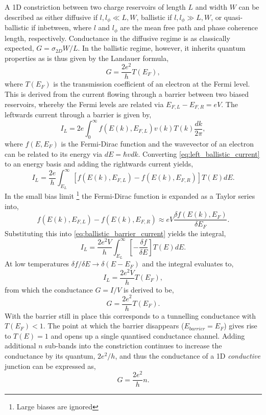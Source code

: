 \documentclass[12pt, a4paper, twoside]{book}
\begin{document}
A 1D constriction between two charge reservoirs of length $L$ and width $W$ can be described as either diffusive if $l,l_\phi \ll L,W$, ballistic if $l,l_\phi \gg L,W$, or quasi-ballistic if inbetween, where $l$ and $l_\phi$ are the mean free path and phase coherence length, respectively. Conductance in the diffusive regime is as classically expected, $G=\sigma_{2D}W/L$. In the ballistic regime, however, it inherits quantum properties as is thus given by the Landauer formula,
\begin{equation} G=\frac{2e^2}{h}T(E_F), \end{equation}
where $T(E_F)$ is the transmission coefficient of an electron at the Fermi level. This is derived from the current flowing through a barrier between two biased reservoirs, whereby the Fermi levels are related via $E_{F,L} - E_{F,R} = eV$. The leftwards current through a barrier is given by,
\begin{equation}
	I_L = 2e \int_0^\infty f(E(k), E_{F,L}) v(k) T(k) \frac{dk}{2\pi},
	\label{eq:left_ballistic_current}
\end{equation}
where $f(E, E_F)$ is the Fermi-Dirac function and the wavevector of an electron can be related to its energy via $dE = \hbar v dk$. Converting \eqref{eq:left_ballistic_current} to an energy basis and adding the rightwards current yields,
\begin{equation}
	I_L = \frac{2e}{h} \int_{E_{L}}^\infty \left[ f(E(k), E_{F,L}) - f(E(k), E_{F,R}) \right] T(E) dE.
	\label{eq:ballistic_barrier_current}
\end{equation}
In the small bias limit%
\footnote{Large biases are ignored}
the Fermi-Dirac function is expanded as a Taylor series into,
\begin{equation}
	f(E(k), E_{F,L}) - f(E(k), E_{F,R}) \approx eV \frac{\delta f(E(k), E_F)}{\delta E_F}.
\end{equation}
Substituting this into \eqref{eq:ballistic_barrier_current} yields the integral,
\begin{equation}
	I_L = \frac{2e^2V}{h} \int_{E_{L}}^\infty \left[ -\frac{\delta f}{\delta E} \right] T(E) dE.
\end{equation}
At low temperatures $\delta f/\delta E \rightarrow \delta(E-E_F)$ and the integral evaluates to,
\begin{equation}
	I_L = \frac{2e^2V}{h}T(E_F),
\end{equation}
from which the conductance $G=I/V$ is derived to be,
\begin{equation}
		G = \frac{2e^2}{h}T(E_F).
\end{equation}
With the barrier still in place this corresponds to a tunnelling conductance with $T(E_F)<1$. The point at which the barrier disappears ($E_{barrier} = E_F$) gives rise to $T(E) = 1$ and opens up a single quantised conductance channel. Adding additional $n$ sub-bands into the constriction continues to increase the conductance by its quantum, $2e^2/h$, and thus the conductance of a 1D \emph{conductive} junction can be expressed as,
\begin{equation}
	G = \frac{2e^2}{h}n.
\end{equation}
\end{document}
